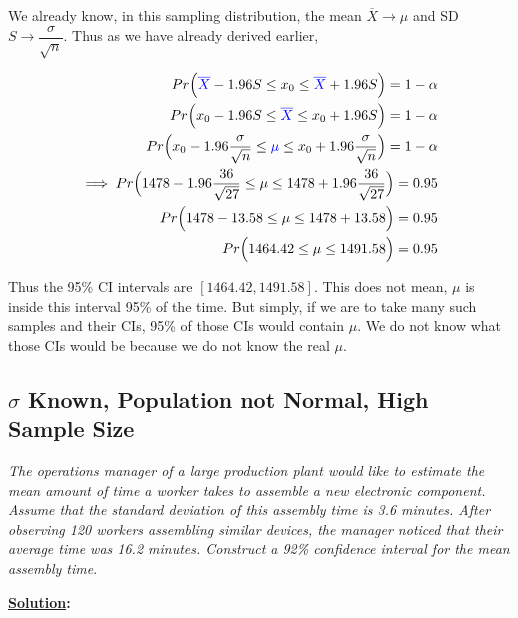 \documentclass[float=false,crop=false]{standalone}
\begin{document}
    We already know, in this sampling distribution, the mean
\(\overline{X} \to \mu\) and SD \(S \to \dfrac{\sigma}{\sqrt{n}}\). Thus
as we have already derived earlier,

\[
            \begin{aligned}
            Pr\Big( {\color{blue}{\overline{X}}} - 1.96S \leq x_0 \leq {\color{blue}{\overline{X}}} + 1.96S\Big) = 1-\alpha \nonumber \\
            Pr\Big( x_0 - 1.96S \leq {\color{blue}{\overline{X}}} \leq x_0 + 1.96S\Big) = 1-\alpha \nonumber \\            
            Pr\Big( x_0 - 1.96\frac{\sigma}{\sqrt{n}} \leq {\color{blue}{\mu}} \leq x_0 + 1.96\frac{\sigma}{\sqrt{n}}\Big) = 1-\alpha \nonumber \\
            \implies Pr\Big( 1478 - 1.96\frac{36}{\sqrt{27}} \leq \mu \leq 1478 + 1.96\frac{36}{\sqrt{27}}\Big) = 0.95 \nonumber \\
            Pr\Big( 1478 - 13.58 \leq \mu \leq 1478 + 13.58\Big) = 0.95 \nonumber \\
            Pr\Big( 1464.42 \leq \mu \leq 1491.58\Big) = 0.95 \nonumber \\
            \end{aligned}
\]

Thus the 95\% CI intervals are \([1464.42,1491.58]\). This does not
mean, \(\mu\) is inside this interval 95\% of the time. But simply, if
we are to take many such samples and their CIs, 95\% of those CIs would
contain \(\mu\). We do not know what those CIs would be because we do
not know the real \(\mu\).

    \subsection{\texorpdfstring{\(\sigma\) Known, Population not Normal,
High Sample
Size}{\textbackslash{}sigma Known, Population not Normal, High Sample Size}}\label{sigma-known-population-not-normal-high-sample-size}

    \emph{The operations manager of a large production plant would like to
estimate the mean amount of time a worker takes to assemble a new
electronic component. Assume that the standard deviation of this
assembly time is 3.6 minutes. After observing 120 workers assembling
similar devices, the manager noticed that their average time was 16.2
minutes. Construct a 92\% confidence interval for the mean assembly
time}.

    \textbf{\href{https://www.utdallas.edu/~mbaron/3341/Practice12.pdf}{Solution}:}
\end{document}
